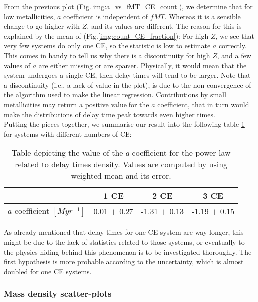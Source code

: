 \documentclass[preprint,12pt]{elsarticle}
\begin{document}
From the previous plot (Fig.\ref{img:a_vs_fMT_CE_count}), we determine that for low metallicities, $a$ coefficient is independent of $fMT$. Whereas it is a sensible change to go higher with $Z$, and its values are different. The reason for this is explained by the mean of (Fig.\ref{img:count_CE_fraction}): For high $Z$, we see that very few systems do only one CE, so the statistic is low to estimate $a$ correctly. This comes in handy to tell us why there is a discontinuity for high $Z$, and a few values of $a$ are either missing or are sparser. Physically, it would mean that the system undergoes a single CE, then delay times will tend to be larger. Note that a discontinuity (i.e., a lack of value in the plot), is due to the non-convergence of the algorithm used to make the linear regression. Contributions by small metallicities may return a positive value for the $a$ coefficient, that in turn would make the distributions of delay time peak towards even higher times.\\
Putting the pieces together, we summarise our result into the following table \ref{table:a_coefficient} for systems with different numbers of CE:

\begin{table}[h!]
\centering
\begin{tabular}{||c c c c||} 
 \hline
   & \textbf{1 CE} & \textbf{2 CE} & \textbf{3 CE}  \\ [0.5ex] 
 \hline\hline
 $a$ coefficient \footnotesize{ $[Myr^{-1}]$ } &  0.01 $\pm$ 0.27 & -1.31 $\pm$ 0.13 & -1.19 $\pm$ 0.15\\
 \hline
\end{tabular}
\caption{Table depicting the value of the $a$ coefficient for the power law related to delay times density. Values are computed by using weighted mean and its error.}
\label{table:a_coefficient}
\end{table}

As already mentioned that delay times for one CE system are way longer, this might be due to the lack of statistics related to those systems, or eventually to the physics hiding behind this phenomenon is to be investigated thoroughly. The first hypothesis is more probable according to the uncertainty, which is almost doubled for one CE systems.

\subsubsection{\textbf{Mass density scatter-plots}}
\end{document}
